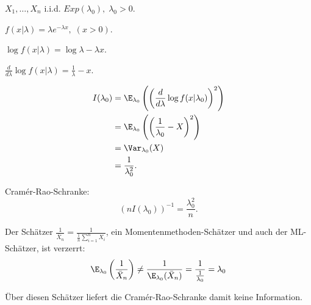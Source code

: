 \documentclass{tstextbook}
\begin{document}
\begin{example}[Exponentialverteilung]
	$ X_1,\ldots,X_n $ i.i.d. $ Exp(\lambda_0), \; \lambda_0 > 0 $. 
	
	$ f(x|\lambda) = \lambda e^{-\lambda x}, \; (x > 0) $. 
	
	$ \log f(x|\lambda) = \log \lambda - \lambda x $. 
	
	$ \frac{d}{d\lambda} \log f(x|\lambda) = \frac{1}{\lambda} - x $. 
	
	\[
	\begin{aligned}
		I(\lambda_0) & = \E_{\lambda_0} \left(\left(\frac{d}{d\lambda}\log f(x|\lambda_0)\right)^2\right) \\
		& = \E_{\lambda_0} \left(\left(\frac{1}{\lambda_0}-X\right)^2\right) \\
		& = \Var_{\lambda_0}(X) \\
		& = \frac{1}{\lambda_0^2}.
	\end{aligned}
	\]
	
	Cramér-Rao-Schranke: 
	\[
	\left(nI(\lambda_0)\right)^{-1} = \frac{\lambda_0^2}{n}.
	\]
	
	Der Schätzer $ \frac{1}{\bar{X}_n} = \frac{1}{\frac{1}{n}\sum_{i=1}^{n}X_i} $, ein Momentenmethoden-Schätzer und auch der ML-Schätzer, ist verzerrt: 
	\[
	\E_{\lambda_0}\left(\frac{1}{\bar{X}_n}\right) \ne \frac{1}{\E_{\lambda_0}(\bar{X}_n)} = \frac{1}{\frac{1}{\lambda_0}}= \lambda_0 
	\]
	
	Über diesen Schätzer liefert die Cramér-Rao-Schranke damit keine Information.
\end{example}
\end{document}
